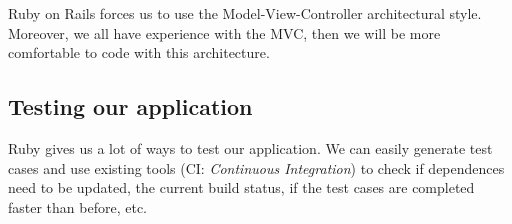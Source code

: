 Ruby on Rails forces us to use the Model-View-Controller architectural style. Moreover, we all have experience with the MVC, then we will be more comfortable to code with this architecture.

\subsection{Testing our application}
Ruby gives us a lot of ways to test our application. We can easily generate test cases and use existing tools (CI: \textit{Continuous Integration}) to check if dependences need to be updated, the current build status, if the test cases are completed faster than before, etc.